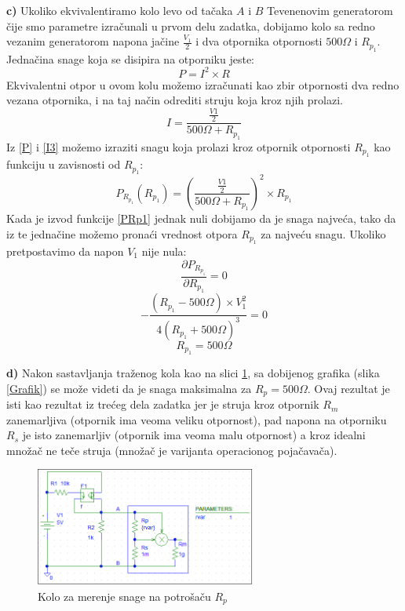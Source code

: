 \documentclass{article}
\begin{document}
    \textbf{c)} Ukoliko ekvivalentiramo kolo levo od tačaka $A$ i $B$ Tevenenovim generatorom čije smo parametre izračunali u prvom delu zadatka, dobijamo kolo sa redno vezanim generatorom napona jačine $\frac{V_1}{2}$ i dva otpornika otpornosti $500\Omega$ i $R_{p_1}$. Jednačina snage koja se disipira na otporniku jeste:
    \begin{equation}
        \label{P}
        P = I^2 \times R
    \end{equation}
    Ekvivalentni otpor u ovom kolu možemo izračunati kao zbir otpornosti dva redno vezana otpornika, i na taj način odrediti struju koja kroz njih prolazi.
    \begin{equation}
        \label{I3}
        I = \frac{\frac{V1}{2}}{500\Omega + R_{p_1}}
    \end{equation}
    Iz \eqref{P} i \eqref{I3} možemo izraziti snagu koja prolazi kroz otpornik otpornosti $R_{p_1}$ kao funkciju u zavisnosti od $R_{p_1}$:
    \begin{equation}
        \label{PRp1}
        P_{R_{p_1}}(R_{p_1}) = (\frac{\frac{V1}{2}}{500\Omega + R_{p_1}})^2 \times R_{p_1}
    \end{equation}
    Kada je izvod funkcije \eqref{PRp1} jednak nuli dobijamo da je snaga najveća, tako da iz te jednačine možemo pronaći vrednost otpora $R_{p_1}$ za najveću snagu. Ukoliko pretpostavimo da napon $V_1$ nije nula:
    $$\frac{\partial P_{R_{p_1}}}{\partial R_{p_1}} = 0$$
    $$-\frac{(R_{p_1} - 500\Omega) \times V_1^2}{4 (R_{p_1} + 500\Omega)^3} = 0$$
    $$R_{p_1} = 500\Omega$$

    \textbf{d)} Nakon sastavljanja traženog kola kao na slici \ref{KoloP}, sa dobijenog grafika (slika \ref{Grafik}) se može videti da je snaga maksimalna za $R_p = 500\Omega$. Ovaj rezultat je isti kao rezultat iz trećeg dela zadatka jer je struja kroz otpornik $R_m$ zanemarljiva (otpornik ima veoma veliku otpornost), pad napona na otporniku $R_s$ je isto zanemarljiv (otpornik ima veoma malu otpornost) a kroz idealni množač ne teče struja (množač je varijanta operacionog pojačavača).

    \begin{figure}[H]
        \centering
        \includegraphics[width=275px]{KoloP.png}
        \caption{Kolo za merenje snage na potrošaču $R_p$}
        \label{KoloP}
    \end{figure}
\end{document}
